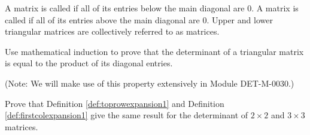 \documentclass{ximera}
\begin{document}
\begin{problem}\label{prob:detoftrimat}
A matrix is called  if all of its entries below the main diagonal are 0.  A matrix is called  if all of its entries above the main diagonal are 0. Upper and lower triangular matrices are collectively referred to as  matrices.

Use mathematical induction to prove that the determinant of a triangular matrix is equal to the product of its diagonal entries.

(Note: We will make use of this property extensively in Module DET-M-0030.)
\end{problem}

\begin{problem}
Prove that Definition \ref{def:toprowexpansion1} and Definition \ref{def:firstcolexpansion1} give the same result for the determinant of $2\times 2$ and $3\times 3$ matrices.
\end{problem}
\end{document}
